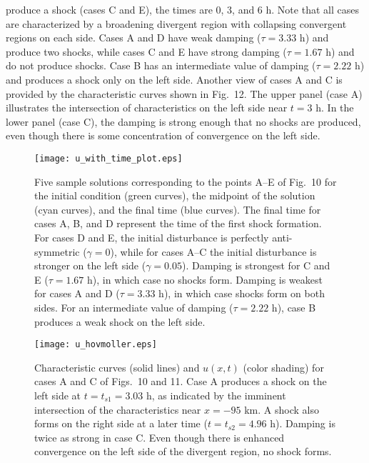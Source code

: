 \documentclass[10pt]{article}
\begin{document}
produce a shock
(cases C and E), the times are 0, 3, and 6 h. Note that all cases are
characterized by a broadening divergent region with collapsing convergent
regions on each side. Cases A and D have weak damping ($\tau=3.33$ h)
and produce two shocks, while cases C and E have strong damping ($\tau=1.67$ h)
and do not produce shocks. Case B has an intermediate value of damping
($\tau=2.22$ h) and produces a shock only on the left side. Another view of
cases A and C is provided by the characteristic curves shown in Fig.~12. The
upper panel (case A) illustrates the intersection of characteristics on the
left side near $t=3$ h. In the lower panel (case C), the damping is strong enough
that no shocks are produced, even though there is some concentration of
convergence on the left side.



\begin{figure*}[!th]                       %
\centerline{\texttt{[image: u\_with\_time\_plot.eps]}}
\caption{Five sample solutions corresponding to the points A--E of Fig.~10
for the initial condition (green curves), the midpoint of the solution (cyan curves),
and the final time (blue curves). The final time for cases A, B, and D
represent the time of the first shock formation.
For cases D and E, the initial disturbance is perfectly anti-symmetric
($\gamma=0$), while for cases A--C the initial disturbance is stronger
on the left side ($\gamma=0.05$). Damping is strongest for C and E
($\tau=1.67$ h), in which case no shocks form. Damping is weakest for
cases A and D ($\tau=3.33$ h), in which case shocks form on both sides.
For an intermediate value of damping ($\tau=2.22$ h), case B produces
a weak shock on the left side.}
\end{figure*}


\begin{figure}[!t]                       %
\centerline{\texttt{[image: u\_hovmoller.eps]}}
\caption{Characteristic curves (solid lines) and $u(x,t)$ (color shading)
for cases A and C of Figs.~10 and 11. Case A produces a shock on the left
side at $t=t_{s1}=3.03$ h, as indicated by the imminent intersection of the
characteristics near $x=-95$ km. A shock also forms on the right side at a
later time ($t=t_{s2}=4.96$ h). Damping is twice as strong in case C.
Even though there is enhanced convergence on the left side of
the divergent region, no shock forms.}
\end{figure}
\end{document}
